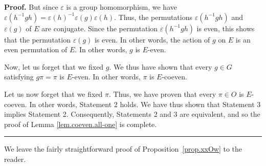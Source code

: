 \documentclass[numbers=enddot,12pt,final,onecolumn,notitlepage,abstracton]{scrartcl}
\theoremstyle{definition}
\newenvironment{proof}[1][Proof]{\noindent\textbf{#1.} }{\ \rule{0.5em}{0.5em}}
\newenvironment{vershort}{}{}
\begin{document}
\begin{proof}
But since $\varepsilon$ is a group homomorphism, we have $\varepsilon\left(
h^{-1}gh\right)  =\varepsilon\left(  h\right)  ^{-1}\varepsilon\left(
g\right)  \varepsilon\left(  h\right)  $. Thus, the permutations
$\varepsilon\left(  h^{-1}gh\right)  $ and $\varepsilon\left(  g\right)  $ of
$E$ are conjugate. Since the permutation $\varepsilon\left(  h^{-1}gh\right)
$ is even, this shows that the permutation $\varepsilon\left(  g\right)  $ is
even. In other words, the action of $g$ on $E$ is an even permutation of $E$.
In other words, $g$ is $E$-even.

Now, let us forget that we fixed $g$. We thus have shown that every $g\in G$
satisfying $g\pi=\pi$ is $E$-even. In other words, $\pi$ is $E$-coeven.

Let us now forget that we fixed $\pi$. Thus, we have proven that every $\pi\in
O$ is $E$-coeven. In other words, Statement 2 holds. We have thus shown that
Statement 3 implies Statement 2. Consequently, Statements 2 and 3 are
equivalent, and so the proof of Lemma \ref{lem.coeven.all-one} is complete.
\end{proof}

\begin{vershort}
We leave the fairly straightforward proof of Proposition~\ref{prop.xxOw}
to the reader.
\end{vershort}
\end{document}
